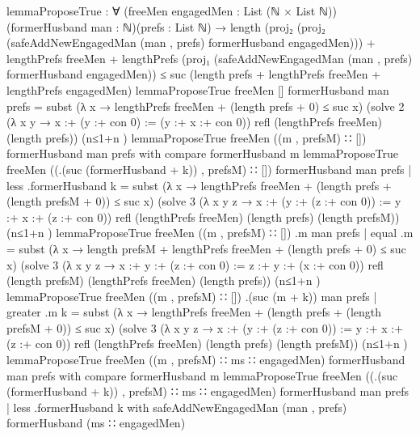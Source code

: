 \documentclass{article}
\begin{document}
\begin{code}
{lemmaProposeTrue : ∀ (freeMen engagedMen : List (ℕ × List ℕ))(formerHusband man : ℕ)(prefs : List ℕ) →
                   length (proj₂ (proj₂ (safeAddNewEngagedMan (man , prefs) formerHusband engagedMen))) + lengthPrefs freeMen + lengthPrefs (proj₁ (safeAddNewEngagedMan (man , prefs) formerHusband engagedMen))
                   ≤ suc (length prefs + lengthPrefs freeMen + lengthPrefs engagedMen)
lemmaProposeTrue freeMen [] formerHusband man prefs = subst (λ x → lengthPrefs freeMen + (length prefs + 0) ≤ suc x)
                                                             (solve 2 (λ x y → x :+ (y :+ con 0) := (y :+ x :+ con 0)) refl (lengthPrefs freeMen) (length prefs))
                                                             (n≤1+n \AgdaUnderscore{})
lemmaProposeTrue freeMen ((m , prefsM) ∷ []) formerHusband man prefs with compare formerHusband m
lemmaProposeTrue freeMen ((.(suc (formerHusband + k)) , prefsM) ∷ []) formerHusband man prefs | less .formerHusband k = subst (λ x → lengthPrefs freeMen + (length prefs + (length prefsM + 0)) ≤ suc x)
                                                                                                                               (solve 3 (λ x y z → x :+ (y :+ (z :+ con 0)) := y :+ x :+ (z :+ con 0)) refl (lengthPrefs freeMen) (length prefs) (length prefsM))
                                                                                                                               (n≤1+n \AgdaUnderscore{})
lemmaProposeTrue freeMen ((m , prefsM) ∷ []) .m man prefs | equal .m = subst (λ x → length prefsM + lengthPrefs freeMen + (length prefs + 0) ≤ suc x)
                                                                              (solve 3 (λ x y z → x :+ y :+ (z :+ con 0) := z :+ y :+ (x :+ con 0)) refl (length prefsM) (lengthPrefs freeMen) (length prefs))
                                                                              (n≤1+n \AgdaUnderscore{})
lemmaProposeTrue freeMen ((m , prefsM) ∷ []) .(suc (m + k)) man prefs | greater .m k = subst (λ x → lengthPrefs freeMen + (length prefs + (length prefsM + 0)) ≤ suc x)
                                                                                              (solve 3 (λ x y z → x :+ (y :+ (z :+ con 0)) := y :+ x :+ (z :+ con 0)) refl (lengthPrefs freeMen) (length prefs) (length prefsM))
                                                                                              (n≤1+n \AgdaUnderscore{})
lemmaProposeTrue freeMen ((m , prefsM) ∷ ms ∷ engagedMen) formerHusband man prefs with compare formerHusband m
lemmaProposeTrue freeMen ((.(suc (formerHusband + k)) , prefsM) ∷ ms ∷ engagedMen) formerHusband man prefs | less .formerHusband k with safeAddNewEngagedMan (man , prefs) formerHusband (ms ∷ engagedMen)
}
\end{code}
\end{document}

